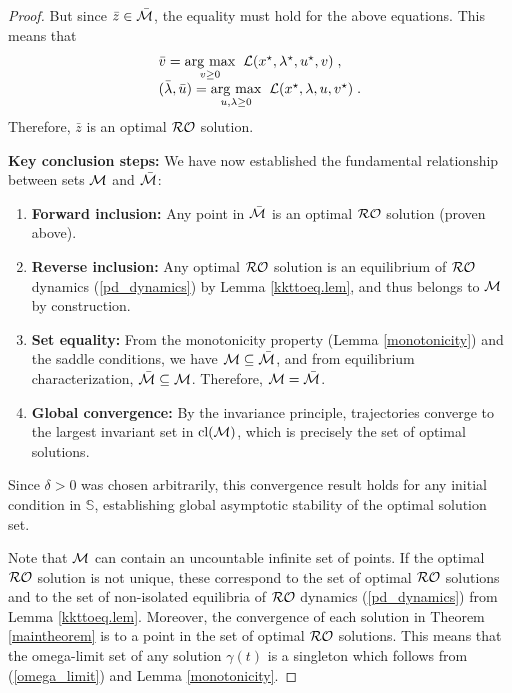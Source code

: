 \documentclass[journal,twoside,web]{ieeecolor}
\newcommand{\rev}[1]{\textcolor{revisionblue}{#1}}
\newcommand{\argmax}[1]{\underset{#1}{\operatorname{arg}\,\operatorname{max}}\;}
\begin{document}
\begin{proof}
But since $\bar{z}\in \bar {\cal M}$, the equality must hold for the above equations. This means that
\begin{align*}
\begin{array}{l}
\bar{v}=\argmax{v \geq 0}\; {\cal L}(x^\star,\lambda^\star,u^\star,v)\;,\\
(\bar{\lambda},\bar{u})=\argmax{u,\lambda \geq 0}\; {\cal L}(x^\star,\lambda,u,v^\star)\;.
\end{array}
\end{align*}
Therefore, ${\bar{z}}$ is an optimal ${\cal RO}$ solution. 

\rev{\textbf{Key conclusion steps:} We have now established the fundamental relationship between sets ${\cal M}$ and $\bar{\cal M}$:
\begin{enumerate}
\item \textbf{Forward inclusion:} Any point in $\bar{\cal M}$ is an optimal ${\cal RO}$ solution (proven above).
\item \textbf{Reverse inclusion:} Any optimal ${\cal RO}$ solution is an equilibrium of ${\cal RO}$ dynamics (\ref{pd_dynamics}) by Lemma \ref{kkttoeq.lem}, and thus belongs to ${\cal M}$ by construction.
\item \textbf{Set equality:} From the monotonicity property (Lemma \ref{monotonicity}) and the saddle conditions, we have ${\cal M} \subseteq \bar{\cal M}$, and from equilibrium characterization, $\bar{\cal M} \subseteq {\cal M}$. Therefore, ${\cal M} = \bar{\cal M}$.
\item \textbf{Global convergence:} By the invariance principle, trajectories converge to the largest invariant set in $\text{cl}({\cal M})$, which is precisely the set of optimal solutions.
\end{enumerate}

Since $\delta > 0$ was chosen arbitrarily, this convergence result holds for any initial condition in $\mathbb S$, establishing global asymptotic stability of the optimal solution set.}

Note that ${\cal M}$ can contain an uncountable infinite set of points. If the optimal ${\cal RO}$ solution is not unique, these correspond to the set of optimal ${\cal RO}$ solutions and to the set of non-isolated equilibria of ${\cal RO}$ dynamics (\ref{pd_dynamics}) from Lemma \ref{kkttoeq.lem}. Moreover, the convergence of each solution in Theorem \ref{maintheorem} is to a point in the set of optimal ${\cal RO}$ solutions. This means that the omega-limit set of any solution $\gamma(t)$ is a singleton which follows from (\ref{omega_limit}) and Lemma \ref{monotonicity}.

\end{proof}
\end{document}
